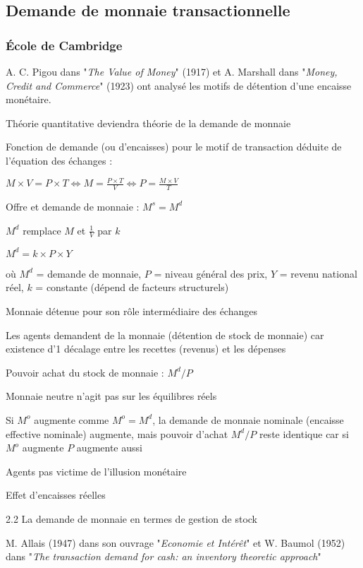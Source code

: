 \documentclass[a4paper, 12pt]{report}
\begin{document}
\subsection{Demande de monnaie transactionnelle}

\subsubsection{École de Cambridge}


A. C. Pigou dans "\textit{The Value of Money}" (1917) et A. Marshall dans "\textit{Money, Credit and Commerce}" (1923) ont analysé les motifs de détention d'une encaisse monétaire.
	
Théorie quantitative deviendra théorie de la demande de monnaie

Fonction de demande (ou d'encaisses) pour le motif de transaction déduite de l'équation des échanges :

$M \times V = P \times T \Leftrightarrow M = \frac{P \times T}{V} \Leftrightarrow P = \frac{M \times V}{T}$

Offre et demande de monnaie : $M^s = M^d$

$M^d$ remplace $M$ et $\frac{1}{V}$ par $k$

$M^d = k \times P \times Y$

où $M^d$ = demande de monnaie, $P$ = niveau général des prix, $Y$ = revenu national réel, $k$ = constante (dépend de facteurs structurels)

Monnaie détenue pour son rôle intermédiaire des échanges

Les agents demandent de la monnaie (détention de stock de monnaie) car existence d'1 décalage entre les recettes (revenus) et les dépenses

Pouvoir achat du stock de monnaie : $M^d/P$

Monnaie neutre n'agit pas sur les équilibres réels

Si $M^o$ augmente comme $M^o = M^d$, la demande de monnaie nominale (encaisse effective nominale) augmente, mais pouvoir d'achat $M^d / P$ reste identique car si $M^o$ augmente $P$ augmente aussi

Agents pas victime de l'illusion monétaire

Effet d'encaisses réelles

2.2 La demande de monnaie en termes de gestion de stock

M. Allais (1947) dans son ouvrage "\textit{Economie et Intérêt}" et W. Baumol (1952) dans "\textit{The transaction demand for cash: an inventory theoretic approach}"
\end{document}
